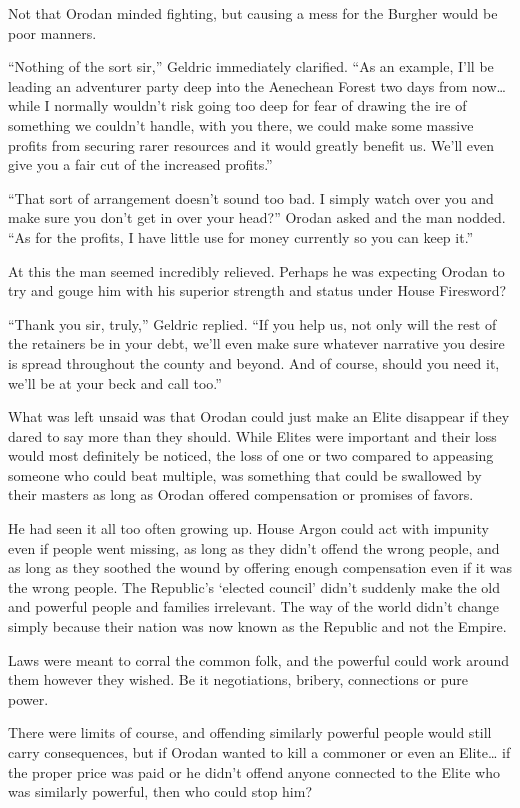 \documentclass[a4paper,10pt]{book}
\begin{document}
Not that Orodan minded fighting, but causing a mess for the Burgher would be poor manners.\par
“Nothing of the sort sir,” Geldric immediately clarified. “As an example, I’ll be leading an adventurer party deep into the Aenechean Forest two days from now… while I normally wouldn’t risk going too deep for fear of drawing the ire of something we couldn’t handle, with you there, we could make some massive profits from securing rarer resources and it would greatly benefit us. We’ll even give you a fair cut of the increased profits.”\par
“That sort of arrangement doesn’t sound too bad. I simply watch over you and make sure you don’t get in over your head?” Orodan asked and the man nodded. “As for the profits, I have little use for money currently so you can keep it.”\par
At this the man seemed incredibly relieved. Perhaps he was expecting Orodan to try and gouge him with his superior strength and status under House Firesword?\par
“Thank you sir, truly,” Geldric replied. “If you help us, not only will the rest of the retainers be in your debt, we’ll even make sure whatever narrative you desire is spread throughout the county and beyond. And of course, should you need it, we'll be at your beck and call too.”\par
What was left unsaid was that Orodan could just make an Elite disappear if they dared to say more than they should. While Elites were important and their loss would most definitely be noticed, the loss of one or two compared to appeasing someone who could beat multiple, was something that could be swallowed by their masters as long as Orodan offered compensation or promises of favors.\par
He had seen it all too often growing up. House Argon could act with impunity even if people went missing, as long as they didn’t offend the wrong people, and as long as they soothed the wound by offering enough compensation even if it was the wrong people. The Republic’s ‘elected council’ didn’t suddenly make the old and powerful people and families irrelevant. The way of the world didn’t change simply because their nation was now known as the Republic and not the Empire.\par
Laws were meant to corral the common folk, and the powerful could work around them however they wished. Be it negotiations, bribery, connections or pure power.\par
There were limits of course, and offending similarly powerful people would still carry consequences, but if Orodan wanted to kill a commoner or even an Elite… if the proper price was paid or he didn’t offend anyone connected to the Elite who was similarly powerful, then who could stop him?\par
\end{document}
